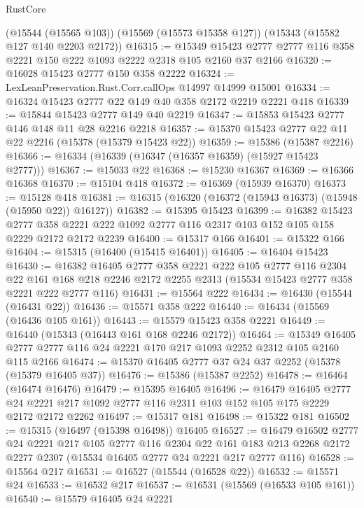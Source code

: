 \begin{lexlean}{RustCore}
\begin{coremodule}
    (@15544 (@15565 @103))
    (@15569 (@15573 @15358 @127))
    (@15343 (@15582 @127 @140 @2203 @2172))
@16315 := @15349 @15423 @2777 @2777 @116 @358 @2221 @150 @222 @1093 @2222 @2318 @105 @2160 @37 @2166
@16320 := @16028 @15423 @2777 @150 @358 @2222
@16324 := LexLeanPreservation.Rust.Corr.callOps @14997 @14999 @15001
@16334 := @16324 @15423 @2777 @22 @149 @40 @358 @2172 @2219 @2221 @418
@16339 := @15844 @15423 @2777 @149 @40 @2219
@16347 := @15853 @15423 @2777 @146 @148 @11 @28 @2216 @2218
@16357 := @15370 @15423 @2777 @22 @11 @22 @2216 (@15378 (@15379 @15423 @22))
@16359 := @15386 (@15387 @2216)
@16366 := @16334 (@16339 (@16347 (@16357 @16359) (@15927 @15423 @2777)))
@16367 := @15033 @22
@16368 := @15230 @16367
@16369 := @16366 @16368
@16370 := @15104 @418
@16372 := @16369 (@15939 @16370)
@16373 := @15128 @418
@16381 := @16315 (@16320 (@16372 (@15943 @16373) (@15948 (@15950 @22)) @16127))
@16382 := @15395 @15423
@16399 := @16382
    @15423
    @2777
    @358
    @2221
    @222
    @1092
    @2777
    @116
    @2317
    @103
    @152
    @105
    @158
    @2229
    @2172
    @2172
    @2239
@16400 := @15317 @166
@16401 := @15322 @166
@16404 := @15315 (@16400 (@15415 @16401))
@16405 := @16404 @15423
@16430 := @16382
    @16405
    @2777
    @358
    @2221
    @222
    @105
    @2777
    @116
    @2304
    @22
    @161
    @168
    @218
    @2246
    @2172
    @2255
    @2313
    (@15534 @15423 @2777 @358 @2221 @222 @2777 @116)
@16431 := @15564 @222
@16434 := @16430 (@15544 (@16431 @22))
@16436 := @15571 @358 @222
@16440 := @16434 (@15569 (@16436 @105 @161))
@16443 := @15579 @15423 @358 @2221
@16449 := @16440 (@15343 (@16443 @161 @168 @2246 @2172))
@16464 := @15349 @16405 @2777 @2777 @116 @24 @2221 @170 @217 @1093 @2252 @2312 @105 @2160 @115 @2166
@16474 := @15370 @16405 @2777 @37 @24 @37 @2252 (@15378 (@15379 @16405 @37))
@16476 := @15386 (@15387 @2252)
@16478 := @16464 (@16474 @16476)
@16479 := @15395 @16405
@16496 := @16479
    @16405
    @2777
    @24
    @2221
    @217
    @1092
    @2777
    @116
    @2311
    @103
    @152
    @105
    @175
    @2229
    @2172
    @2172
    @2262
@16497 := @15317 @181
@16498 := @15322 @181
@16502 := @15315 (@16497 (@15398 @16498)) @16405
@16527 := @16479
    @16502
    @2777
    @24
    @2221
    @217
    @105
    @2777
    @116
    @2304
    @22
    @161
    @183
    @213
    @2268
    @2172
    @2277
    @2307
    (@15534 @16405 @2777 @24 @2221 @217 @2777 @116)
@16528 := @15564 @217
@16531 := @16527 (@15544 (@16528 @22))
@16532 := @15571 @24
@16533 := @16532 @217
@16537 := @16531 (@15569 (@16533 @105 @161))
@16540 := @15579 @16405 @24 @2221

\end{coremodule}
\end{lexlean}
